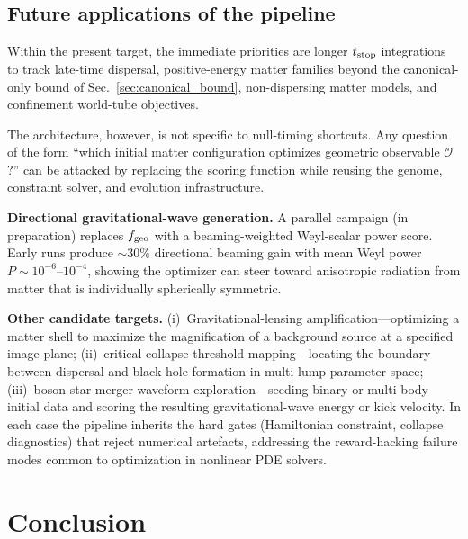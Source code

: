 \documentclass[twocolumn,floatfix,aps,prd,nofootinbib]{revtex4-2}
\begin{document}
\subsection{Future applications of the pipeline}
\label{sec:future_apps}

Within the present target, the immediate priorities are longer $t_{\rm stop}$
integrations to track late-time dispersal, positive-energy matter families
beyond the canonical-only bound of Sec.~\ref{sec:canonical_bound},
non-dispersing matter models, and confinement world-tube objectives.

The architecture, however, is not specific to null-timing shortcuts. Any
question of the form ``which initial matter configuration optimizes geometric
observable $\mathcal{O}$?'' can be attacked by replacing the scoring function
while reusing the genome, constraint solver, and evolution infrastructure.

\textbf{Directional gravitational-wave generation.}
A parallel campaign (in preparation) replaces $f_{\rm geo}$ with a
beaming-weighted Weyl-scalar power score. Early runs produce ${\sim}30\%$
directional beaming gain with mean Weyl power $P\sim10^{-6}$--$10^{-4}$,
showing the optimizer can steer toward anisotropic radiation from matter that
is individually spherically symmetric.

\textbf{Other candidate targets.}
(i)~Gravitational-lensing amplification---optimizing a matter shell to
maximize the magnification of a background source at a specified image
plane;
(ii)~critical-collapse threshold mapping---locating the boundary
between dispersal and black-hole formation in multi-lump parameter
space;
(iii)~boson-star merger waveform exploration---seeding binary or
multi-body initial data and scoring the resulting gravitational-wave
energy or kick velocity.
In each case the pipeline inherits the hard gates (Hamiltonian
constraint, collapse diagnostics) that reject numerical artefacts,
addressing the reward-hacking failure modes common to
optimization in nonlinear PDE solvers.

\section{Conclusion}
\label{sec:conclusion}
\end{document}
